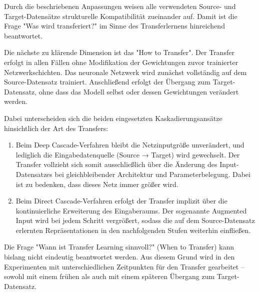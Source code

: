 Durch die beschriebenen Anpassungen weisen alle verwendeten Source- und Target-Datensätze strukturelle Kompatibilität zueinander auf. Damit ist 
die Frage "Was wird transferiert?" im Sinne des Transferlernens hinreichend beantwortet.

Die nächste zu klärende Dimension ist das "How to Transfer". Der Transfer erfolgt in allen Fällen ohne Modifikation der Gewichtungen zuvor 
trainierter Netzwerkschichten. Das neuronale Netzwerk wird zunächst vollständig auf dem Source-Datensatz trainiert. Anschließend erfolgt der 
Übergang zum Target-Datensatz, ohne dass das Modell selbst oder dessen Gewichtungen verändert werden.

Dabei unterscheiden sich die beiden eingesetzten Kaskadierungsansätze hinsichtlich der Art des Transfers:
\begin{enumerate}
    \item Beim Deep Cascade-Verfahren bleibt die Netzinputgröße unverändert, und lediglich die Eingabedatenquelle (Source → Target) wird gewechselt. 
    Der Transfer vollzieht sich somit ausschließlich über die Änderung des Input-Datensatzes bei gleichbleibender Architektur und 
    Parameterbelegung. Dabei ist zu bedenken, dass dieses Netz immer größer wird.
    \item Beim Direct Cascade-Verfahren erfolgt der Transfer implizit über die kontinuierliche Erweiterung des Eingaberaums. Der sogenannte 
    Augmented Input wird bei jedem Schritt vergrößert, sodass die auf dem Source-Datensatz erlernten Repräsentationen in den nachfolgenden 
    Stufen weiterhin einfließen.
\end{enumerate}
    
    
Die Frage "Wann ist Transfer Learning sinnvoll?" (When to Transfer) kann bislang nicht eindeutig beantwortet werden. Aus diesem Grund wird in 
den Experimenten mit unterschiedlichen Zeitpunkten für den Transfer gearbeitet – sowohl mit einem frühen als auch mit einem späteren Übergang 
zum Target-Datensatz.
